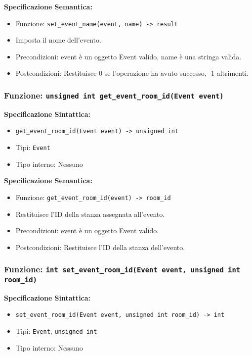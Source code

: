 \documentclass[11pt]{scrartcl} %
\begin{document}
\textbf{Specificazione Semantica:}
\begin{itemize}
\item Funzione: \texttt{set\_event\_name(event, name) -> result}
\item Imposta il nome dell'evento.
\item Precondizioni: event è un oggetto Event valido, name è una stringa valida.
\item Postcondizioni: Restituisce 0 se l'operazione ha avuto successo, -1 altrimenti.
\end{itemize}

\subsubsection{Funzione: \texttt{unsigned int get\_event\_room\_id(Event event)}}

\textbf{Specificazione Sintattica:}
\begin{itemize}
\item \texttt{get\_event\_room\_id(Event event) -> unsigned int}
\item Tipi: \texttt{Event}
\item Tipo interno: Nessuno
\end{itemize}

\textbf{Specificazione Semantica:}
\begin{itemize}
\item Funzione: \texttt{get\_event\_room\_id(event) -> room\_id}
\item Restituisce l'ID della stanza assegnata all'evento.
\item Precondizioni: event è un oggetto Event valido.
\item Postcondizioni: Restituisce l'ID della stanza dell'evento.
\end{itemize}

\subsubsection{Funzione: \texttt{int set\_event\_room\_id(Event event, unsigned int room\_id)}}

\textbf{Specificazione Sintattica:}
\begin{itemize}
\item \texttt{set\_event\_room\_id(Event event, unsigned int room\_id) -> int}
\item Tipi: \texttt{Event}, \texttt{unsigned int}
\item Tipo interno: Nessuno
\end{itemize}
\end{document}
